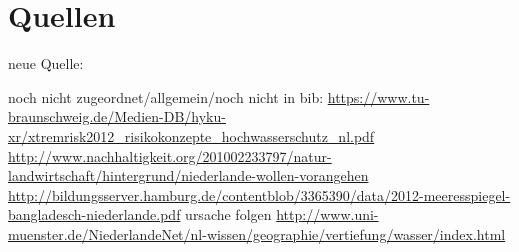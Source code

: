\part{Quellen}


neue Quelle:

noch nicht zugeordnet/allgemein/noch nicht in bib:
\url{https://www.tu-braunschweig.de/Medien-DB/hyku-xr/xtremrisk2012_risikokonzepte_hochwasserschutz_nl.pdf}
\url{http://www.nachhaltigkeit.org/201002233797/natur-landwirtschaft/hintergrund/niederlande-wollen-vorangehen}
\url{http://bildungsserver.hamburg.de/contentblob/3365390/data/2012-meeresspiegel-bangladesch-niederlande.pdf} ursache folgen
\url{http://www.uni-muenster.de/NiederlandeNet/nl-wissen/geographie/vertiefung/wasser/index.html}





